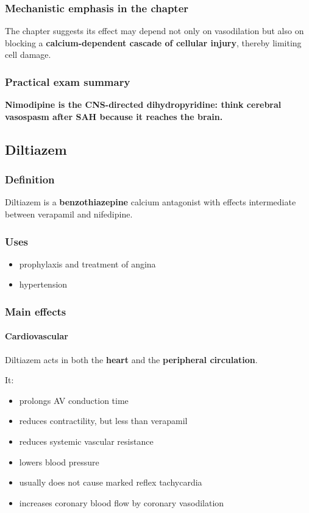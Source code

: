 \documentclass[11pt,a4paper]{article}
\begin{document}
\subsubsection*{Mechanistic emphasis in the chapter}

The chapter suggests its effect may depend not only on vasodilation but also on blocking a \textbf{calcium-dependent cascade of cellular injury}, thereby limiting cell damage.

\subsubsection*{Practical exam summary}

\textbf{Nimodipine is the CNS-directed dihydropyridine: think cerebral vasospasm after SAH because it reaches the brain.}

\subsection{Diltiazem}

\subsubsection*{Definition}

Diltiazem is a \textbf{benzothiazepine} calcium antagonist with effects intermediate between verapamil and nifedipine.

\subsubsection*{Uses}
\begin{itemize}
    \item prophylaxis and treatment of angina
    \item hypertension
\end{itemize}

\subsubsection*{Main effects}

\paragraph{Cardiovascular}
Diltiazem acts in both the \textbf{heart} and the \textbf{peripheral circulation}.

It:
\begin{itemize}
    \item prolongs AV conduction time
    \item reduces contractility, but less than verapamil
    \item reduces systemic vascular resistance
    \item lowers blood pressure
    \item usually does not cause marked reflex tachycardia
    \item increases coronary blood flow by coronary vasodilation
\end{itemize}
\end{document}
